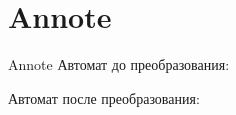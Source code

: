 \section{Annote}
\begin{frame}{Annote}
	Автомат до преобразования:


	Автомат после преобразования:


\end{frame}
